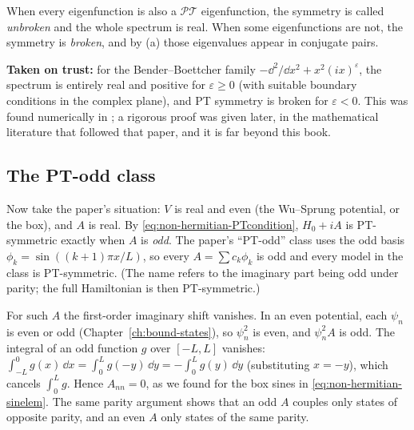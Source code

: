 When every eigenfunction is also a $\mathcal{PT}$ eigenfunction, the symmetry is called \emph{unbroken} and the whole spectrum is real. When some eigenfunctions are not, the symmetry is \emph{broken}, and by (a) those eigenvalues appear in conjugate pairs.

\begin{beyond}
\textbf{Taken on trust:} for the Bender--Boettcher family $-\dd^2/\dd x^2+x^2(ix)^\varepsilon$, the spectrum is entirely real and positive for $\varepsilon\ge0$ (with suitable boundary conditions in the complex plane), and PT symmetry is broken for $\varepsilon<0$. This was found numerically in \cite{bender98}; a rigorous proof was given later, in the mathematical literature that followed that paper, and it is far beyond this book.
\end{beyond}

\subsection{The PT-odd class}

Now take the paper's situation: $V$ is real and even (the Wu--Sprung potential, or the box), and $A$ is real. By \eqref{eq:non-hermitian-PTcondition}, $H_0+iA$ is PT-symmetric exactly when $A$ is \emph{odd}. The paper's ``PT-odd'' class uses the odd basis $\phi_k=\sin((k+1)\pi x/L)$, so every $A=\sum c_k\phi_k$ is odd and every model in the class is PT-symmetric. (The name refers to the imaginary part being odd under parity; the full Hamiltonian is then PT-symmetric.)

For such $A$ the first-order imaginary shift vanishes. In an even potential, each $\psi_n$ is even or odd (Chapter~\ref{ch:bound-states}), so $\psi_n^2$ is even, and $\psi_n^2A$ is odd. The integral of an odd function $g$ over $[-L,L]$ vanishes: $\int_{-L}^{0}g(x)\,\dd x=\int_{0}^{L}g(-y)\,\dd y=-\int_0^Lg(y)\,\dd y$ (substituting $x=-y$), which cancels $\int_0^L g$. Hence $A_{nn}=0$, as we found for the box sines in \eqref{eq:non-hermitian-sinelem}. The same parity argument shows that an odd $A$ couples only states of opposite parity, and an even $A$ only states of the same parity.

